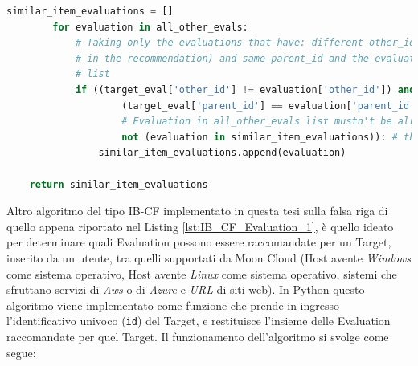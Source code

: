 \begin{itemize}
\begin{lstlisting}[language=Python, label=lst:IB_CF_Evaluation_3]
        similar_item_evaluations = []
        for evaluation in all_other_evals:
            # Taking only the evaluations that have: different other_id (excluding the target evaluation
            # in the recommendation) and same parent_id and the evaluations that weren't added to similar_item_evaluations
            # list
            if ((target_eval['other_id'] != evaluation['other_id']) and  # Evaluations must have different 'other_id'
                    (target_eval['parent_id'] == evaluation['parent_id']) and  # Evaluations must have same 'parent_id'
                    # Evaluation in all_other_evals list mustn't be already added to \
                    not (evaluation in similar_item_evaluations)): # the 'similar_item_evaluations' list
                similar_item_evaluations.append(evaluation)
    
    return similar_item_evaluations 
    \end{lstlisting}
\end{itemize}
%
Altro algoritmo del tipo IB-CF implementato in questa tesi sulla falsa riga di quello appena riportato nel Listing \ref{lst:IB_CF_Evaluation_1}, 
è quello ideato per determinare quali Evaluation possono essere raccomandate per un Target, inserito da un utente, tra quelli supportati da Moon Cloud
(Host avente \textit{Windows} come sistema operativo, Host avente \textit{Linux} come sistema operativo, sistemi che sfruttano 
servizi di \textit{Aws} o di \textit{Azure} e \textit{URL} di siti web).\hfill\break
In Python questo algoritmo viene implementato come funzione che prende in ingresso l'identificativo univoco (\texttt{id}) del Target, e 
restituisce l'insieme delle Evaluation raccomandate per quel Target. Il funzionamento dell'algoritmo si svolge come segue:
